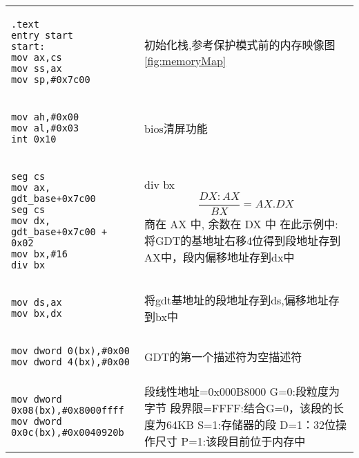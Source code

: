\documentclass{ctexart}
\begin{document}
  \begin{longtable}{ |*{1}{m{.55\paperwidth}} | *{1}{m{.40\paperwidth}} |}
      \toprule
      \begin{verbatim}
.text
entry start
start:
mov ax,cs
mov ss,ax
mov sp,#0x7c00  
      \end{verbatim}
      & 初始化栈,参考保护模式前的内存映像图\ref{fig:memoryMap}  \\
      \cline{2-2}
      \begin{verbatim}
mov ah,#0x00
mov al,#0x03
int 0x10
      \end{verbatim} 
      &   bios清屏功能  \\
      \cline{2-2}
      \begin{verbatim}
seg cs
mov ax, gdt_base+0x7c00 
seg cs
mov dx, gdt_base+0x7c00 + 0x02
mov bx,#16
div bx  
      \end{verbatim} 
      & 
      \colorbox{gray!80} {\Large div bx}
      $$
          \frac{DX:AX}{BX} = AX.DX
      $$ 
      商在 AX 中, 余数在 DX 中  \newline 
      在此示例中: \newline
      将GDT的基地址右移4位得到段地址存到AX中，段内偏移地址存到dx中    \\
      \cline{2-2}
      \begin{verbatim}
mov ds,ax
mov bx,dx
      \end{verbatim} 
      & 将gdt基地址的段地址存到ds,偏移地址存到bx中  \\
      \cline{2-2}
      \begin{verbatim}
mov dword 0(bx),#0x00
mov dword 4(bx),#0x00
      \end{verbatim}     
      & GDT的第一个描述符为空描述符   \\
      \cline{2-2}
      \begin{verbatim}
mov dword 0x08(bx),#0x8000ffff
mov dword 0x0c(bx),#0x0040920b
      \end{verbatim} 
      & 
      段线性地址=0x000B8000   \newline
      G=0:段粒度为字节     \newline
      段界限=FFFF:结合G=0，该段的长度为64KB   \newline
      S=1:存储器的段          \newline
      D=1：32位操作尺寸       \newline
      P=1:该段目前位于内存中   \newline

\end{longtable}
\end{document}
